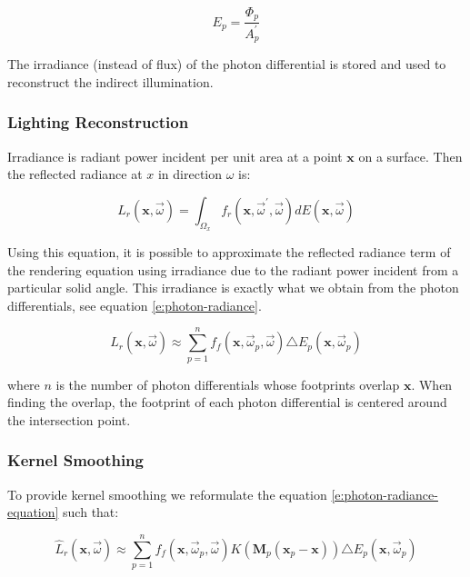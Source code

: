 \begin{equation}\label{e:photon-radiance}
	E_p=\frac{\Phi_p}{A^{'}_p}
\end{equation}

The irradiance (instead of flux) of the photon differential is stored and used to reconstruct the indirect illumination.


\subsubsection{Lighting Reconstruction}
Irradiance is radiant power incident per unit area at a point $\mathbf{x}$ on a surface. Then the reflected radiance at $x$ in direction $\omega$ is:

\begin{equation*}
	L_r(\mathbf{x},\vec{\omega})=\int_{\Omega_x} f_r(\mathbf{x},\vec{\omega}^{'},\vec{\omega})dE(\mathbf{x},\vec{\omega})
\end{equation*}

Using this equation, it is possible to approximate the reflected radiance term of the rendering equation using irradiance due to the radiant power incident from a particular solid angle. This irradiance is exactly what we obtain from the photon differentials, see equation \ref{e:photon-radiance}.

\begin{equation}\label{e:photon-radiance-equation}
	L_r(\mathbf{x},\vec{\omega})\approx\sum^{n}_{p=1} f_f(\mathbf{x},\vec{\omega}_p,\vec{\omega})\triangle E_p(\mathbf{x},\vec{\omega}_p)
\end{equation}

where $n$ is the number of photon differentials whose footprints overlap $\mathbf{x}$. When finding the overlap, the footprint of each photon differential is centered around the intersection point.



\subsubsection{Kernel Smoothing}
To provide kernel smoothing we reformulate the equation \ref{e:photon-radiance-equation} such that:

\begin{equation}\label{e:photon-radiance-equation}
	\hat{L}_r(\mathbf{x},\vec{\omega})\approx\sum^{n}_{p=1} f_f(\mathbf{x},\vec{\omega}_p,\vec{\omega})K(\mathbf{M}_p(\mathbf{x}_p-\mathbf{x}))\triangle E_p(\mathbf{x},\vec{\omega}_p)
\end{equation}

